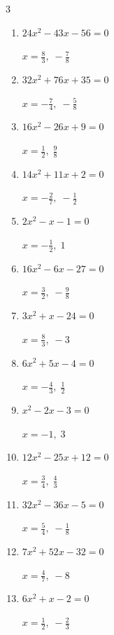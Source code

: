 \begin{multicols}{3}
\begin{enumerate}
  \item $24x^{2}-43x-56=0$

        $\displaystyle x=\frac{8}{3},\; -\frac{7}{8}$

  \item $32x^{2}+76x+35=0$

        $\displaystyle x=-\frac{7}{4},\; -\frac{5}{8}$

  \item $16x^{2}-26x+9=0$

        $\displaystyle x=\frac{1}{2},\; \frac{9}{8}$

  \item $14x^{2}+11x+2=0$

        $\displaystyle x=-\frac{2}{7},\; -\frac{1}{2}$

  \item $2x^{2}-x-1=0$

        $\displaystyle x=-\frac{1}{2},\; 1$

  \item $16x^{2}-6x-27=0$

        $\displaystyle x=\frac{3}{2},\; -\frac{9}{8}$

  \item $3x^{2}+x-24=0$

        $\displaystyle x=\frac{8}{3},\; -3$

  \item $6x^{2}+5x-4=0$

        $\displaystyle x=-\frac{4}{3},\; \frac{1}{2}$

\columnbreak %

  \item $x^{2}-2x-3=0$

        $\displaystyle x=-1,\; 3$

  \item $12x^{2}-25x+12=0$

        $\displaystyle x=\frac{3}{4},\; \frac{4}{3}$

  \item $32x^{2}-36x-5=0$

        $\displaystyle x=\frac{5}{4},\; -\frac{1}{8}$

  \item $7x^{2}+52x-32=0$

        $\displaystyle x=\frac{4}{7},\; -8$

  \item $6x^{2}+x-2=0$

        $\displaystyle x=\frac{1}{2},\; -\frac{2}{3}$


\end{enumerate}
\end{multicols}
